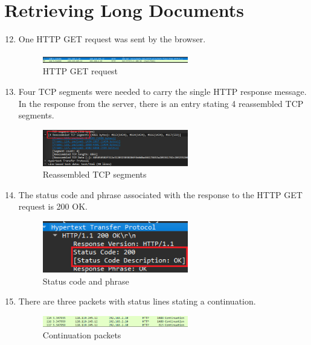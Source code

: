 \documentclass{article}
\begin{document}
\section{Retrieving Long Documents}
\begin{enumerate}
    \setcounter{enumi}{11}
    \item One HTTP GET request was sent by the browser. 
    \begin{figure}[ht!]
        \centering
        \includegraphics[width=0.6\textwidth]{p4_4}
        \caption{HTTP GET request}
        \label{fig:p4_0}
    \end{figure}
    \item Four TCP segments were needed to carry the single HTTP response message. In the response from the server, there is an entry stating 4 reassembled TCP segments.
    \begin{figure}[ht!]
        \centering
        \includegraphics[width=0.6\textwidth]{p4_1}
        \caption{Reassembled TCP segments}
        \label{fig:p4_1}
    \end{figure}
    \item The status code and phrase associated with the response to the HTTP GET request is 200 OK.
    \begin{figure}[ht!]
        \centering
        \includegraphics[width=0.6\textwidth]{p4_2}
        \caption{Status code and phrase}
        \label{fig:p4_2}
    \end{figure}
    \item There are three packets with status lines stating a continuation.
    \begin{figure}[ht!]
        \centering
        \includegraphics[width=0.6\textwidth]{p4_3}
        \caption{Continuation packets}
        \label{fig:p4_3}
    \end{figure}
\end{enumerate}
\end{document}
